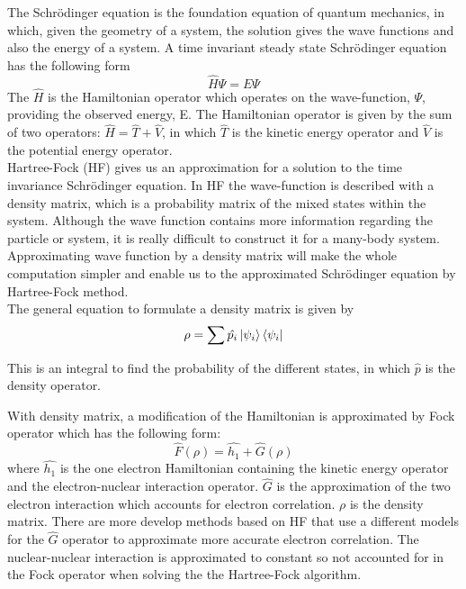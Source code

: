 \documentclass[twoside]{article}
\begin{document}


The Schrödinger equation is the foundation equation of quantum mechanics, in which, given the geometry of a system, the solution gives the wave functions and also the energy of a system. 
A time invariant steady state Schrödinger equation has the following form
\[
				\hat{H}\Psi = E\Psi
\]
The $\hat{H}$ is the Hamiltonian operator which operates on the wave-function, $\Psi$, providing the observed energy, E. The Hamiltonian operator is given by the sum of two operators: $\hat{H} = \hat{T} + \hat{V}$,  in which $\hat{T}$ is the kinetic energy operator and $\hat{V}$ is the potential energy operator.\\


Hartree-Fock (HF) gives us an approximation for a solution to the time invariance Schrödinger equation. In HF the wave-function is described with a density matrix, which is a probability matrix of the mixed states within the system. Although the wave function contains more information regarding the particle or system, it is really difficult to construct it for a many-body system.  
Approximating wave function by a density matrix will make the whole computation simpler and enable us to the approximated Schrödinger equation by Hartree-Fock method. \\  

The general equation to formulate a density matrix is given by
\[
\rho = \sum\hat{p_i}\ket{\psi_i}\bra{\psi_i}
\]


This is an integral to find the probability of the different states, in which $\hat{p}$ is the density operator. 

With density matrix,
a modification of the Hamiltonian is approximated by Fock operator which has the following form:
\[
\hat{F}(\rho) = \hat{h_1} + \hat{G}(\rho)
\]
where $\hat{h_1}$ is the one electron Hamiltonian containing the kinetic energy operator and the electron-nuclear interaction operator. $\hat{G}$ is the approximation of the two electron interaction which accounts for electron correlation. $\rho$ is the density matrix.
There are more develop methods based on HF that use a different models for the $\hat{G}$ operator to approximate more accurate electron correlation. The nuclear-nuclear interaction is approximated to constant so not accounted for in the Fock operator when solving the the Hartree-Fock algorithm. \\ 
\end{document}
